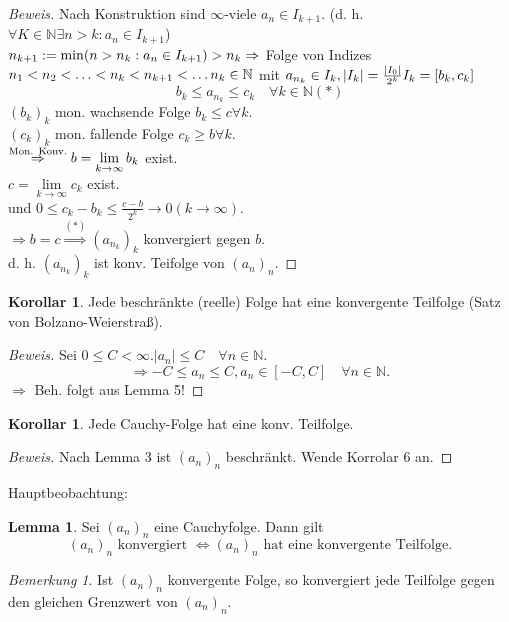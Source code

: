 \documentclass[12pt,a4paper,titlepage]{article} %
\theoremstyle{definition}
\newtheorem{kor}[satz]{Korollar}
\newtheorem{lem}[satz]{Lemma}
\theoremstyle{remark}
\newtheorem*{bem}{Bemerkung}
\newenvironment{bew}{\begin{proof}[Beweis]}{\end{proof}}
\newcommand{\N}{\mathbb{N}}
\newcommand{\limes}[1]{\lim\limits_{#1\rightarrow\infty}}
\begin{document}
\begin{bew}
	Nach Konstruktion sind \(\infty\)-viele \(a_n\in I_{k+1} \). (d. h. \(\forall K\in\N \exists n>k:a_n\in I_{k+1} \))\\
	\( n_{k+1} := \min (n>n_k: a_n \in I_{k+1}) > n_k\\
	\Rightarrow \) Folge von Indizes \(n_1 <n_2<\ldots<n_k<n_{k+1}<\ldots\\
	n_k\in\N \) mit \( a_{n_k} \in I_k, |I_k| = \frac{|I_0|}{2^k}\\
	I_k = [b_k, c_k] \)
	\[b_k \leq a_{n_k} \leq c_k \quad \forall k\in\N (*) \]
	\( (b_k)_k \) mon. wachsende Folge \(b_k\leq c \forall k \).\\
	\( (c_k)_k \) mon. fallende Folge \( c_k \geq b \forall k \).\\
	\( \overset{\text{Mon. Konv.}}{\Rightarrow} \\b= \limes{k} b_k \) exist.\\
	\(c = \limes{k} c_k \) exist.\\
	und \(0 \leq c_k - b_k \leq \frac{c-b}{2^k} \rightarrow0 (k\rightarrow\infty) \).\\
	\(\Rightarrow b=c \overset{(*)}{\Rightarrow} (a_{n_k})_k \) konvergiert gegen \(b\).\\
	d. h. \( (a_{n_k})_k \) ist konv. Teifolge von \( (a_n)_n \).
\end{bew}
\begin{kor}
	Jede beschränkte (reelle) Folge hat eine konvergente Teilfolge (Satz von Bolzano-Weierstraß).
\end{kor}
\begin{bew}
	Sei \( 0\leq C < \infty. |a_n| \leq C \quad\forall n\in\N. \)\\
	\[ \Rightarrow -C \leq a_n \leq C, a_n \in [-C, C] \quad\forall n\in\N. \]
	\( \Rightarrow \) Beh. folgt aus Lemma 5!
\end{bew}
\begin{kor}
	Jede Cauchy-Folge hat eine konv. Teilfolge.
\end{kor}
\begin{bew}
	Nach Lemma 3 ist \( (a_n)_n \) beschränkt. Wende Korrolar 6 an.
\end{bew}
Hauptbeobachtung:
\begin{lem}
	Sei \((a_n)_n\) eine Cauchyfolge. Dann gilt
	\[ (a_n)_n \text{ konvergiert } \Leftrightarrow (a_n)_n \text{ hat eine konvergente Teilfolge.} \]
\end{lem}
\begin{bem}
	Ist \( (a_n)_n \) konvergente Folge, so konvergiert jede Teilfolge gegen den gleichen Grenzwert von \((a_n)_n\).
\end{bem}
\end{document}
